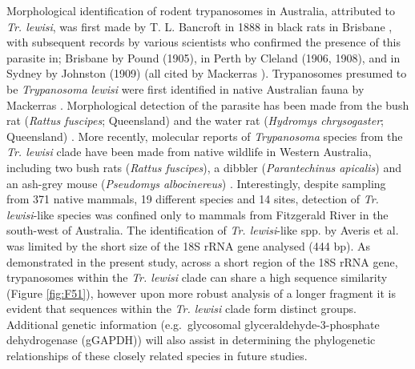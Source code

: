 \documentclass[a4paper, nobind]{templates/ociamthesis}
\begin{document}
Morphological identification of rodent trypanosomes in Australia, attributed to \emph{Tr. lewisi}, was first made by T. L. Bancroft in 1888 in black rats in Brisbane \autocite{mackerrasHaematozoaAustralianMammals1959}, with subsequent records by various scientists who confirmed the presence of this parasite in; Brisbane by Pound (1905), in Perth by Cleland (1906, 1908), and in Sydney by Johnston (1909) (all cited by Mackerras \autocite*{mackerrasHaematozoaAustralianMammals1959}). Trypanosomes presumed to be \emph{Trypanosoma} \emph{lewisi} were first identified in native Australian fauna by Mackerras \autocite*{mackerrasCatalogueAustralianMammals1958a}. Morphological detection of the parasite has been made from the bush rat (\emph{Rattus fuscipes}; Queensland) and the water rat (\emph{Hydromys chrysogaster}; Queensland) \autocite{mackerrasHaematozoaAustralianMammals1959,mackerrasCatalogueAustralianMammals1958a}. More recently, molecular reports of \emph{Trypanosoma} species from the \emph{Tr. lewisi} clade have been made from native wildlife in Western Australia, including two bush rats (\emph{Rattus fuscipes}), a dibbler (\emph{Parantechinus apicalis}) and an ash-grey mouse (\emph{Pseudomys albocinereus}) \autocite{averisDiversityDistributionHostparasite2009}. Interestingly, despite sampling from 371 native mammals, 19 different species and 14 sites, detection of \emph{Tr. lewisi}-like species was confined only to mammals from Fitzgerald River in the south-west of Australia. The identification of \emph{Tr. lewisi}-like spp. by Averis et al. \autocite*{averisDiversityDistributionHostparasite2009} was limited by the short size of the 18S rRNA gene analysed (444 bp). As demonstrated in the present study, across a short region of the 18S rRNA gene, trypanosomes within the \emph{Tr. lewisi} clade can share a high sequence similarity (Figure \ref{fig:F51}), however upon more robust analysis of a longer fragment it is evident that sequences within the \emph{Tr. lewisi} clade form distinct groups. Additional genetic information (e.g.~glycosomal glyceraldehyde-3-phosphate dehydrogenase (gGAPDH)) will also assist in determining the phylogenetic relationships of these closely related species in future studies.
\end{document}
